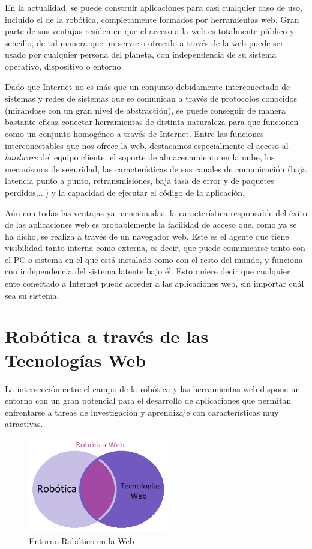En la actualidad, se puede construir aplicaciones para casi cualquier caso de uso, incluido el de la robótica, completamente formados por herramientas web. Gran parte de sus ventajas residen en que el acceso a la web es totalmente público y sencillo, de tal manera que un servicio ofrecido a través de la web puede ser usado por cualquier persona del planeta, con independencia de su sistema operativo, dispositivo o entorno. 

Dado que Internet no es más que un conjunto debidamente interconectado de sistemas y redes de sistemas que se comunican a través de protocolos conocidos (mirándose con un gran nivel de abstracción), se puede conseguir de manera bastante eficaz conectar herramientas de distinta naturaleza para que funcionen como un conjunto homogéneo a través de Internet. Entre las funciones interconectables que nos ofrece la web, destacamos especialmente el acceso al \textit{hardware} del equipo cliente, el soporte de almacenamiento en la nube, los mecanismos de seguridad, las características de sus canales de comunicación (baja latencia punto a punto, retransmisiones, baja tasa de error y de paquetes perdidos,...) y la capacidad de ejecutar el código de la aplicación. 

Aún con todas las ventajas ya mencionadas, la característica responsable del éxito de las aplicaciones web es probablemente la facilidad de acceso que, como ya se ha dicho, se realiza a través de un navegador web. Este es el agente que tiene visibilidad tanto interna como externa, es decir, que puede comunicarse tanto con el PC o sistema en el que está instalado como con el resto del mundo, y funciona con independencia del sistema latente bajo él. Esto quiere decir que cualquier ente conectado a Internet puede acceder a las aplicaciones web, sin importar cuál sea su sistema. 

\section{Robótica a través de las Tecnologías Web}

La intersección entre el campo de la robótica y las herramientas web dispone un entorno con un gran potencial para el desarrollo de aplicaciones que permitan enfrentarse a tareas de investigación y aprendizaje con características muy atractivas.

\begin{figure}[!hbtp]  \centering\noindent
    \includegraphics[width=0.55\textwidth]{figures/intersection.png}
    \caption{Entorno Robótico en la Web}
    \label{web}
\end{figure}

